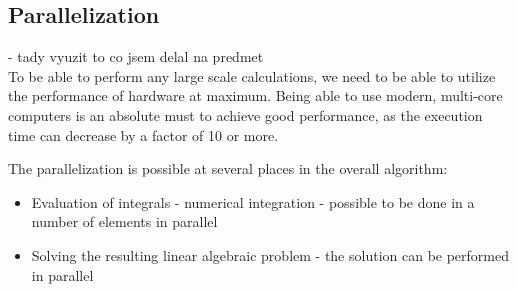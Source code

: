 \subsection{Parallelization}
- tady vyuzit to co jsem delal na predmet\\
To be able to perform any large scale calculations, we need to be able to utilize the performance of hardware at maximum. Being able to use modern, multi-core computers is an absolute must to achieve good performance, as the execution time can decrease by a factor of 10 or more.

The parallelization is possible at several places in the overall algorithm:
\begin{itemize}
\item Evaluation of integrals - numerical integration - possible to be done in a number of elements in parallel
\item Solving the resulting linear algebraic problem - the solution can be performed in parallel
\end{itemize}
